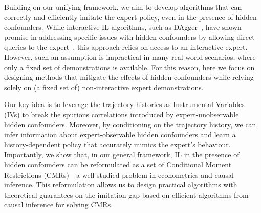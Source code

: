 Building on our unifying framework, we aim to develop algorithms that can correctly and efficiently imitate the expert policy, even in the presence of hidden confounders. While interactive IL algorithms, such as DAgger~\citep{Ross2011}, have shown promise in addressing specific issues with hidden confounders by allowing direct queries to the expert~\citep{Swamy2022,Vuorio2022,Swamy2022_temporal}, this approach relies on access to an interactive expert. However, such an assumption is impractical in many real-world scenarios, where only a fixed set of demonstrations is available. For this reason, here we focus on designing methods that mitigate the effects of hidden confounders while relying solely on (a fixed set of) non-interactive expert demonstrations.




 Our key idea is to leverage the trajectory histories as Instrumental Variables (IVs) to break the spurious correlations introduced by expert-unobservable hidden confounders. Moreover, by conditioning on the trajectory history, we can infer information about expert-observable hidden confounders and learn a history-dependent policy that accurately mimics the expert's behaviour. Importantly, we show that, in our general framework, IL in the presence of hidden confounders can be reformulated as a set of Conditional Moment Restrictions (CMRs)---a well-studied problem in econometrics and causal inference. This reformulation allows us to design practical algorithms with theoretical guarantees on the imitation gap based on efficient algorithms from causal inference for solving CMRs. 





